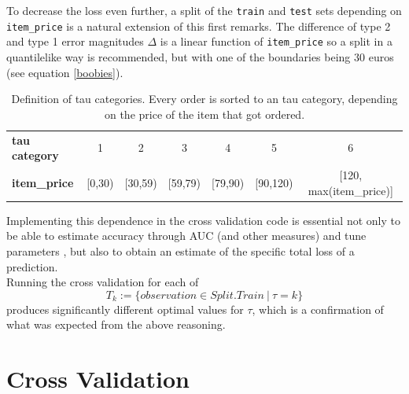 \documentclass[a4paper,12pt]{article}
\begin{document}
To decrease the loss even further, a split of the \texttt{train} and \texttt{test} sets depending on \texttt{item\_price} is a natural extension of this first remarks.
The difference of type 2 and type 1 error magnitudes $\Delta$ is a linear function of \texttt{item\_price} so a split in a quantile\-like way is recommended, but with one of the boundaries being $30$ euros (see equation \ref{boobies}).
\begin{center}
\begin{table}[h]
\begin{tabular}{|l|| c | c | c | c | c | c |}
\hline
\textbf{tau category} & 1 & 2 & 3 & 4 & 5 & 6 \\
\textbf{item\_price}  & {[}0,30)   & {[}30,59)   & {[}59,79)  & {[}79,90)   & {[}90,120)    & {[}120, max(item\_price){]} \\
\hline
\end{tabular}
 \caption{Definition of tau categories. Every order is sorted to an tau category, depending on the price of the item that got ordered.}
 \label{Table::Tau}
\end{table}
\end{center}
Implementing this dependence in the cross validation code is essential not only to be able to estimate accuracy through AUC (and other measures) and tune parameters , but also to obtain an estimate of the specific total loss of a prediction.\\
Running the cross validation for each of $$T_k:=\{observation \in Split.Train \ | \ \tau = k\}$$ produces significantly different optimal values for $\tau$, which is a confirmation of what was expected from the above reasoning. 

\section{Cross Validation}\label{Sec::CV}
\end{document}

